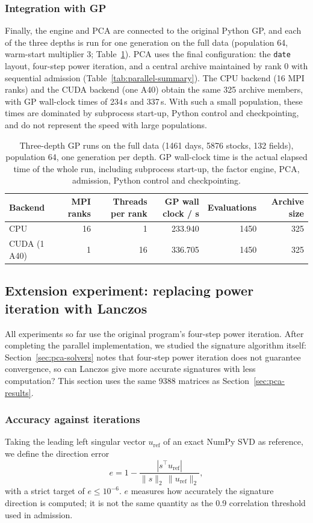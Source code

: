 \documentclass[11pt,a4paper]{article}
\newcommand{\code}[1]{\texttt{#1}}
\begin{document}
\subsubsection{Integration with GP}
Finally, the engine and PCA are connected to the original Python GP, and each of the three depths is run for one generation on the full data (population 64, warm-start multiplier 3; Table~\ref{tab:live-gp}). PCA uses the final configuration: the \code{date} layout, four-step power iteration, and a central archive maintained by rank 0 with sequential admission (Table~\ref{tab:parallel-summary}). The CPU backend (16 MPI ranks) and the CUDA backend (one A40) obtain the same 325 archive members, with GP wall-clock times of 234\,s and 337\,s. With such a small population, these times are dominated by subprocess start-up, Python control and checkpointing, and do not represent the speed with large populations.
\begin{table}[H]
\centering\small
\caption{Three-depth GP runs on the full data (1461 days, 5876 stocks, 132 fields), population 64, one generation per depth. GP wall-clock time is the actual elapsed time of the whole run, including subprocess start-up, the factor engine, PCA, admission, Python control and checkpointing.}
\label{tab:live-gp}
\begin{tabular}{lrrrrr}
\toprule
Backend & MPI ranks & Threads per rank & GP wall clock / s & Evaluations & Archive size \\
\midrule
CPU & 16 & 1 & 233.940 & 1450 & 325 \\
CUDA (1 A40) & 1 & 16 & 336.705 & 1450 & 325 \\
\bottomrule
\end{tabular}
\end{table}

\subsection{Extension experiment: replacing power iteration with Lanczos}
\label{sec:solver-results}
All experiments so far use the original program's four-step power iteration. After completing the parallel implementation, we studied the signature algorithm itself: Section~\ref{sec:pca-solvers} notes that four-step power iteration does not guarantee convergence, so can Lanczos give more accurate signatures with less computation? This section uses the same 9388 matrices as Section~\ref{sec:pca-results}.

\subsubsection{Accuracy against iterations}
Taking the leading left singular vector $u_{\mathrm{ref}}$ of an exact NumPy SVD as reference, we define the direction error
\begin{equation}
 e=1-\frac{|s^\top u_{\mathrm{ref}}|}{\|s\|_2\,\|u_{\mathrm{ref}}\|_2},
 \label{eq:direction-error}
\end{equation}
with a strict target of $e\le10^{-6}$. $e$ measures how accurately the signature direction is computed; it is not the same quantity as the 0.9 correlation threshold used in admission.
\end{document}
